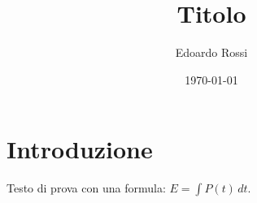 \documentclass[11pt,a4paper]{article}
\title{Titolo}
\author{Edoardo Rossi}
\date{\today}
\begin{document}
\maketitle

\section{Introduzione}
Testo di prova con una formula: $E = \int P(t)\,dt$.
\end{document}
